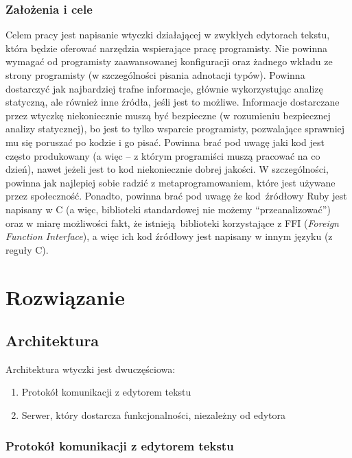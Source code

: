 \documentclass[declaration,shortabstract,mgr]{iithesis}
\begin{document}
\subsection{Założenia i cele}

Celem pracy jest napisanie wtyczki działającej w zwykłych edytorach tekstu, która będzie oferować narzędzia wspierające pracę programisty.
Nie powinna wymagać od programisty zaawansowanej konfiguracji oraz żadnego wkładu ze strony programisty (w szczególności pisania adnotacji typów).
Powinna dostarczyć jak najbardziej trafne informacje, głównie wykorzystując analizę statyczną, ale również inne źródła, jeśli jest to możliwe.
Informacje dostarczane przez wtyczkę niekoniecznie muszą być bezpieczne (w rozumieniu bezpiecznej analizy statycznej), bo jest to tylko wsparcie programisty, pozwalające sprawniej mu się poruszać po kodzie i go pisać.
Powinna brać pod uwagę jaki kod jest często produkowany (a więc -- z którym programiści muszą pracować na co dzień), nawet jeżeli jest to kod niekoniecznie dobrej jakości.
W szczególności, powinna jak najlepiej sobie radzić z metaprogramowaniem, które jest używane przez społeczność.
Ponadto, powinna brać pod uwagę że kod źródłowy Ruby jest napisany w C (a więc, biblioteki standardowej nie możemy ``przeanalizować'') oraz w miarę możliwości fakt, że istnieją biblioteki korzystające z FFI (\textit{Foreign Function Interface}), a więc ich kod źródłowy jest napisany w innym języku (z reguły C).

\chapter{Rozwiązanie}

\section{Architektura}

Architektura wtyczki jest dwuczęściowa:
\begin{enumerate}
\item Protokół komunikacji z edytorem tekstu
\item Serwer, który dostarcza funkcjonalności, niezależny od edytora
\end{enumerate}

\subsection{Protokół komunikacji z edytorem tekstu}
\end{document}
